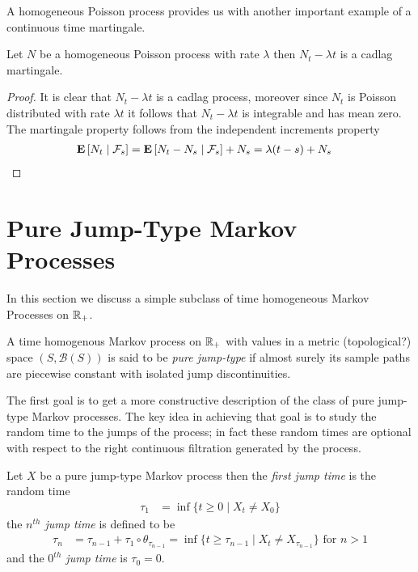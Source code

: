 A homogeneous Poisson process provides us with another important
example of a continuous time martingale.
\begin{prop}\label{CompensatedHomogeneousPoissonProcessMartingale}Let $N$ be a homogeneous Poisson process with rate
  $\lambda$ then $N_t - \lambda t$ is a cadlag martingale.
\end{prop}
\begin{proof}
It is clear that $N_t - \lambda t$ is a cadlag process, moreover since
$N_t$ is Poisson distributed with rate $\lambda t$ it follows that
$N_t - \lambda t$ is integrable and has mean zero.  The martingale
property follows from the independent increments property
\begin{align*}
\cexpectationlong{\mathcal{F}_s}{N_t} 
&=\cexpectationlong{\mathcal{F}_s}{N_t - N_s}  + N_s = \lambda(t-s) + N_s
\end{align*}
\end{proof}

\section{Pure Jump-Type Markov Processes}
In this section we discuss a simple subclass of time homogeneous
Markov Processes on $\reals_+$.
\begin{defn}A time homogenous Markov process on $\reals_+$ with values
  in a metric (topological?) space $(S, \mathcal{B}(S))$ is said to be \emph{pure
    jump-type} if almost surely its sample paths are piecewise
  constant with isolated jump discontinuities.
\end{defn}

The first goal is to get a more constructive description of the class
of pure jump-type Markov processes.  The key idea in achieving that goal
is to study the random time to the jumps of the process; in fact these
random times are optional with respect to the right continuous
filtration generated by the process.

\begin{defn}Let $X$ be a pure jump-type Markov process then the
  \emph{first jump time} is the random time
\begin{align*}
\tau_1 &=\inf \lbrace t \geq 0 \mid X_t \neq X_0 \rbrace
\end{align*}
 the \emph{$n^{th}$ jump time} is defined to be 
\begin{align*}
\tau_n &= \tau_{n-1} + \tau_1 \circ \theta_{\tau_{n-1}} = \inf \lbrace
t \geq \tau_{n-1} \mid X_t \neq X_{\tau_{n-1}} \rbrace \text{ for $n > 1$}
\end{align*}
and the \emph{$0^{th}$ jump time} is $\tau_0 = 0$.
\end{defn}

